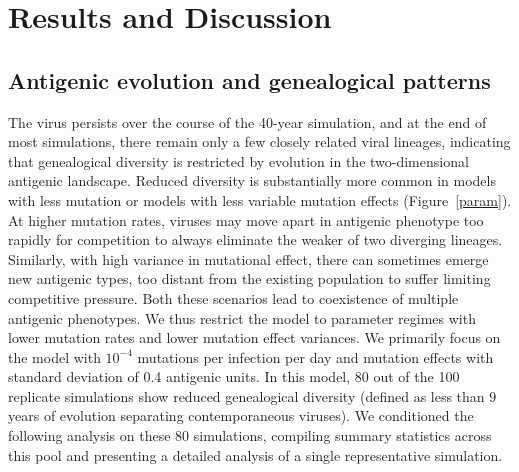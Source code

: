 \documentclass[11pt,oneside,letterpaper]{article}
\begin{document}
\section*{Results and Discussion}

\subsection*{Antigenic evolution and genealogical patterns}

The virus persists over the course of the 40-year simulation, and at the end of most simulations, there remain only a few closely related viral lineages, indicating that genealogical diversity is restricted by evolution in the two-dimensional antigenic landscape.  Reduced diversity is substantially more common in models with less mutation or models with less variable mutation effects (Figure~\ref{param}).  At higher mutation rates, viruses may move apart in antigenic phenotype too rapidly for competition to always eliminate the weaker of two diverging lineages.  Similarly, with high variance in mutational effect, there can sometimes emerge new antigenic types, too distant from the existing population to suffer limiting competitive pressure.  Both these scenarios lead to coexistence of multiple antigenic phenotypes.  We thus restrict the model to parameter regimes with lower mutation rates and lower mutation effect variances.  We primarily focus on the model with $10^{-4}$ mutations per infection per day and mutation effects with standard deviation of 0.4 antigenic units.  In this model, 80 out of the 100 replicate simulations show reduced genealogical diversity (defined as less than 9 years of evolution separating contemporaneous viruses).  We conditioned the following analysis on these 80 simulations, compiling summary statistics across this pool and presenting a detailed analysis of a single representative simulation.  
\end{document}
